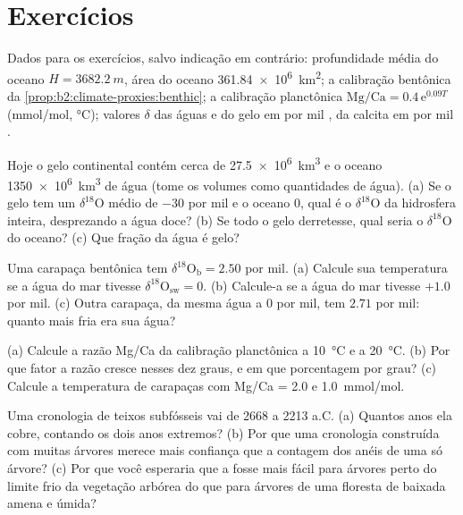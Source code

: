 \section*{Exercícios}\label{sec:b2:climate-proxies:exercises}

Dados para os exercícios, salvo indicação em contrário: profundidade média do oceano $H = \qty{3682.2}{m}$, área
do oceano \qty{361.84e6}{km^2}; a calibração bentônica da \cref{prop:b2:climate-proxies:benthic}; a
calibração planctônica $\text{Mg/Ca} = 0.4\,\mathrm{e}^{0.09T}$ (\unit{mmol/mol}, \unit{\celsius});
valores $\delta$ das águas e do gelo em por mil , da calcita em por mil .

\begin{exercise}[$\star$]\label{exo:b2:climate-proxies:1}
Hoje o gelo continental contém cerca de \qty{27.5e6}{km^3} e o oceano \qty{1350e6}{km^3} de
água (tome os volumes como quantidades de água). (a) Se o gelo tem um $\delta^{18}$O médio de $-30$ por
mil e o oceano 0, qual é o $\delta^{18}$O da hidrosfera inteira, desprezando a água
doce? (b) Se todo o gelo derretesse, qual seria o $\delta^{18}$O do oceano? (c) Que
fração da água é gelo?
\end{exercise}

\begin{exercise}[$\star$]\label{exo:b2:climate-proxies:2}
Uma carapaça bentônica tem $\delta^{18}\mathrm{O}_{\mathrm{b}} = 2.50$ por mil. (a) Calcule sua
temperatura se a água do mar tivesse $\delta^{18}\mathrm{O}_{\mathrm{sw}} = 0$. (b) Calcule-a se a
água do mar tivesse $+1.0$ por mil. (c) Outra carapaça, da mesma água a $0$ por mil, tem
$2.71$ por mil: quanto mais fria era sua água?
\end{exercise}

\begin{exercise}[$\star$]\label{exo:b2:climate-proxies:3}
(a) Calcule a razão Mg/Ca da calibração planctônica a \qty{10}{\celsius} e a
\qty{20}{\celsius}. (b) Por que fator a razão cresce nesses dez graus, e em que
porcentagem por grau? (c) Calcule a temperatura de carapaças com Mg/Ca = 2.0 e
\qty{1.0}{mmol/mol}.
\end{exercise}

\begin{exercise}[$\star$]\label{exo:b2:climate-proxies:4}
Uma cronologia de teixos subfósseis vai de 2668 a 2213 a.C. (a) Quantos anos ela cobre,
contando os dois anos extremos? (b) Por que uma cronologia construída com muitas árvores merece mais confiança que
a contagem dos anéis de uma só árvore? (c) Por que você esperaria que a  fosse mais fácil para
árvores perto do limite frio da vegetação arbórea do que para árvores de uma floresta de baixada amena e úmida?
\end{exercise}

